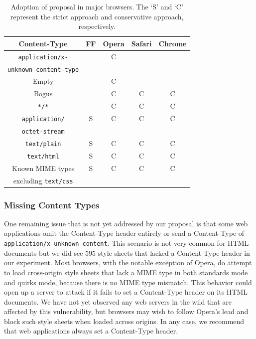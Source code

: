 \documentclass{acm_proc_article-sp}
\begin{document}
\begin{table}
\centering
\begin{tabular}{|c|c|c|c|c|} \hline
Content-Type&FF&Opera&Safari&Chrome\\ \hline
\texttt{application/x-}&&C&&\\ 
\texttt{unknown-content-type}&&&&\\ \hline
Empty&&C&&\\ \hline
Bogus&&C&C&C \\ \hline
\texttt{*/*}&&C&C&C \\ \hline
\texttt{application/}&S&C&C&C\\ 
\texttt{octet-stream}&&&&\\ \hline
\texttt{text/plain}&S&C&C&C\\ \hline
\texttt{text/html}&S&C&C&C\\ \hline
Known MIME types&S&C&C&C\\
excluding \texttt{text/css}&&&&\\
\hline\end{tabular}
\caption{Adoption of proposal in major browsers. The `S' and `C' represent the strict approach and conservative approach, respectively.}
\label{table:adoption}
\end{table}

\subsubsection{Missing Content Types}

One remaining issue that is not yet addressed by our proposal is that some web
applications omit the Content-Type header entirely or send a Content-Type of
\verb|application/x-unknown-content|. This scenario is not very common for
HTML documents but we did see 595 style sheets that lacked a Content-Type
header in our experiment. Most browsers, 
with the notable exception of Opera, do attempt to load cross-origin
style sheets that lack a MIME type in both standards mode and quirks mode,
because there is no MIME type mismatch. This behavior could open up a server
to attack if it fails to set a Content-Type header on its HTML documents. We
have not yet observed any web servers in the wild that are affected by this
vulnerability, but browsers may wish to follow Opera's lead and block such
style sheets when loaded across origins. In any case, we recommend that web
applications always set a Content-Type header.
\end{document}
